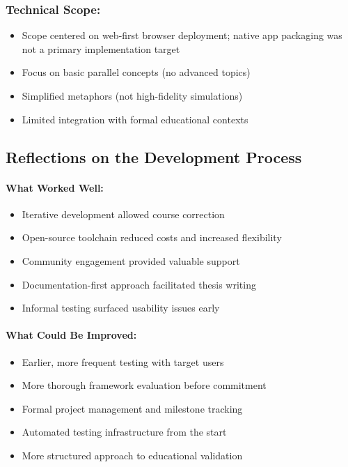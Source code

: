 \subsubsection{Technical Scope:}

\begin{itemize}
    \item Scope centered on web-first browser deployment; native app packaging was not a primary implementation target
    \item Focus on basic parallel concepts (no advanced topics)
    \item Simplified metaphors (not high-fidelity simulations)
    \item Limited integration with formal educational contexts
\end{itemize}

\subsection{Reflections on the Development Process}
\label{subsec:development-reflections}

\paragraph*{What Worked Well:}

\begin{itemize}
    \item Iterative development allowed course correction
    \item Open-source toolchain reduced costs and increased flexibility
    \item Community engagement provided valuable support
    \item Documentation-first approach facilitated thesis writing
    \item Informal testing surfaced usability issues early
\end{itemize}

\paragraph*{What Could Be Improved:}

\begin{itemize}
    \item Earlier, more frequent testing with target users
    \item More thorough framework evaluation before commitment
    \item Formal project management and milestone tracking
    \item Automated testing infrastructure from the start
    \item More structured approach to educational validation
\end{itemize}

